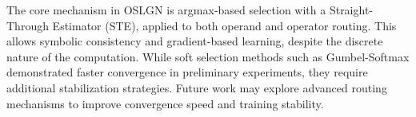 The core mechanism in OSLGN is argmax-based selection with a Straight-Through Estimator (STE), applied to both operand and operator routing. This allows symbolic consistency and gradient-based learning, despite the discrete nature of the computation. While soft selection methods such as Gumbel-Softmax demonstrated faster convergence in preliminary experiments, they require additional stabilization strategies. Future work may explore advanced routing mechanisms to improve convergence speed and training stability.
